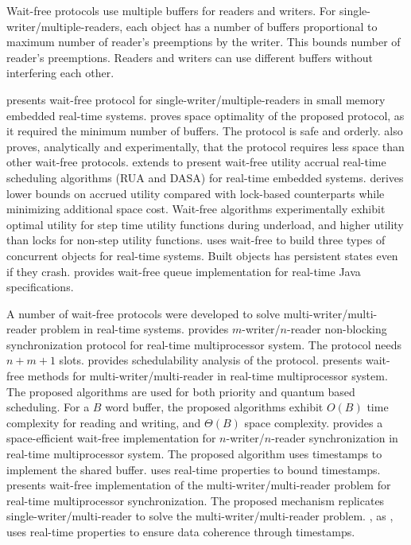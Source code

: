 \documentclass[12pt,english]{report}
\begin{document}
Wait-free protocols use multiple buffers for readers and writers.
For single-writer/multiple-readers, each object has a number of buffers
proportional to maximum number of reader's preemptions by the writer.
This bounds number of reader's preemptions. Readers and writers can
use different buffers without interfering each other.

\cite{1508449} presents wait-free protocol for single-writer/multiple-readers
in small memory embedded real-time systems. \cite{1508449} proves
space optimality of the proposed protocol, as it required the minimum
number of buffers. The protocol is safe and orderly. \cite{1508449}
also proves, analytically and experimentally, that the protocol requires
less space than other wait-free protocols. \cite{Cho:2006:UAP:1141277.1141490}
extends \cite{1508449} to present wait-free utility accrual real-time
scheduling algorithms (RUA and DASA) for real-time embedded systems.
\cite{Cho:2006:UAP:1141277.1141490} derives lower bounds on accrued
utility compared with lock-based counterparts while minimizing additional
space cost. Wait-free algorithms experimentally exhibit optimal utility
for step time utility functions during underload, and higher utility
than locks for non-step utility functions. \cite{1003807} uses wait-free
to build three types of concurrent objects for real-time systems.
Built objects has persistent states even if they crash. \cite{1613351}
provides wait-free queue implementation for real-time Java specifications.

A number of wait-free protocols were developed to solve multi-writer/multi-reader
problem in real-time systems. \cite{811240} provides $m$-writer/$n$-reader
non-blocking synchronization protocol for real-time multiprocessor
system. The protocol needs $n+m+1$ slots. \cite{811240} provides
schedulability analysis of the protocol. \cite{896371} presents wait-free
methods for multi-writer/multi-reader in real-time multiprocessor
system. The proposed algorithms are used for both priority and quantum
based scheduling. For a $B$ word buffer, the proposed algorithms
exhibit $O(B)$ time complexity for reading and writing, and $\Theta(B)$
space complexity. \cite{896423} provides a space-efficient wait-free
implementation for $n$-writer/$n$-reader synchronization in real-time
multiprocessor system. The proposed algorithm uses timestamps to implement
the shared buffer. \cite{896423} uses real-time properties to bound
timestamps. \cite{1203552} presents wait-free implementation of the
multi-writer/multi-reader problem for real-time multiprocessor synchronization.
The proposed mechanism replicates single-writer/multi-reader to solve
the multi-writer/multi-reader problem. \cite{1203552}, as \cite{896423},
uses real-time properties to ensure data coherence through timestamps.
\end{document}
